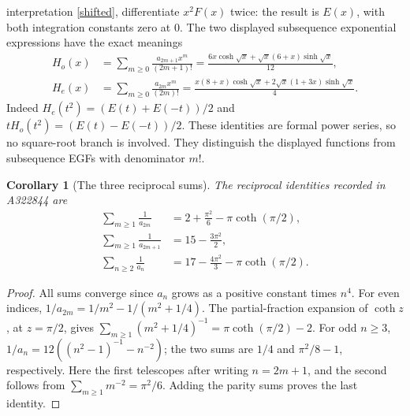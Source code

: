 \documentclass[11pt]{article}
\newtheorem{corollary}[theorem]{Corollary}
\begin{document}
interpretation \eqref{shifted}, differentiate $x^2F(x)$ twice:
the result is $E(x)$, with both integration constants zero at $0$.
The two displayed subsequence exponential expressions have the exact meanings
\begin{align*}
 H_o(x)&=\sum_{m\geq0}\frac{a_{2m+1}x^m}{(2m+1)!}
 =\frac{6x\cosh\sqrt{x}+\sqrt{x}(6+x)\sinh\sqrt{x}}{12},\\
 H_e(x)&=\sum_{m\geq0}\frac{a_{2m}x^m}{(2m)!}
 =\frac{x(8+x)\cosh\sqrt{x}+2\sqrt{x}(1+3x)\sinh\sqrt{x}}{4}.
\end{align*}
Indeed $H_e(t^2)=(E(t)+E(-t))/2$ and
$tH_o(t^2)=(E(t)-E(-t))/2$. These identities are formal power series,
so no square-root branch is involved. They distinguish the displayed
functions from subsequence EGFs with denominator $m!$.

\begin{corollary}[The three reciprocal sums]\label{recip}
The reciprocal identities recorded in A322844 are
\begin{align*}
 \sum_{m\geq1}\frac1{a_{2m}}&=2+\frac{\pi^2}{6}-\pi\coth(\pi/2),\\
 \sum_{m\geq1}\frac1{a_{2m+1}}&=15-\frac{3\pi^2}{2},\\
 \sum_{n\geq2}\frac1{a_n}&=17-\frac{4\pi^2}{3}-\pi\coth(\pi/2).
\end{align*}
\end{corollary}
\begin{proof}
All sums converge since $a_n$ grows as a positive constant times $n^4$.
For even indices, $1/a_{2m}=1/m^2-1/(m^2+1/4)$.
The partial-fraction expansion of $\coth z$ \cite{dlmf}, at $z=\pi/2$,
gives $\sum_{m\geq1}(m^2+1/4)^{-1}=\pi\coth(\pi/2)-2$.
For odd $n\geq3$, $1/a_n=12((n^2-1)^{-1}-n^{-2})$;
the two sums are $1/4$ and $\pi^2/8-1$, respectively.
Here the first telescopes after writing $n=2m+1$, and the second follows
from $\sum_{m\geq1}m^{-2}=\pi^2/6$. Adding the parity sums proves the last identity.
\end{proof}
\end{document}
